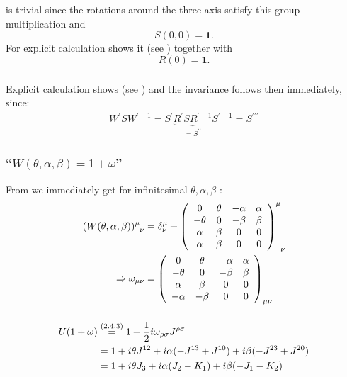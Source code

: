 \subsubsection{ }
 is trivial since the rotations around the three axis satisfy this group multiplication and \[S(0,0)=\mathbf{1}.\]
For  explicit calculation shows it (see \todo) together with \[R(0)=\mathbf{1}.\]

\subsubsection{ }
Explicit calculation shows  (see \todo) and the invariance follows then immediately, since:
\begin{align*} 
	W^\prime SW^{\prime-1}=S^\prime \underbrace{R^\prime S R^{\prime-1}}_{=S^{\prime\prime}} S^{\prime-1}=S^{\prime\prime\prime}
\end{align*}

\subsubsection{\enquote{$W(\theta,\alpha,\beta)=1+\omega$} }
From  we immediately get for infinitesimal $\theta,\alpha,\beta$ :
\begin{align*} 
	(W(\theta,\alpha,\beta))^\mu_{\hphantom{\mu}\nu}&=\delta^\mu_\nu+
	\left(
	\begin{array}{cccc}
		0&  \theta&  -\alpha&  \alpha\\
		-\theta&  0&  -\beta&  \beta\\
		\alpha&  \beta&  0&  0\\
		\alpha&  \beta&  0& 0
	\end{array}
	\right)^\mu_{\hphantom{\mu}\nu}\\
	\Rightarrow \omega_{\mu \nu}&=\left(
	\begin{array}{cccc}
		0&  \theta&  -\alpha&  \alpha\\
		-\theta&  0&  -\beta&  \beta\\
		\alpha&  \beta&  0&  0\\
		-\alpha&  -\beta&  0& 0
	\end{array}
	\right)_{\mu\nu}
\end{align*}

\subsubsection{ }
\begin{align*} 
	U(1+\omega)&\overset{({2.4.3})}{=}1+\dfrac{1}{2}i \omega_{\rho \sigma} J^{\rho\sigma}\\
	&=1+i\theta J^{12}+i\alpha(-J^{13}+J^{10})+i\beta(-J^{23}+J^{20})\\
	&=1+i\theta J_3+i\alpha(J_2-K_1)+i\beta(-J_1-K_2)
\end{align*}

